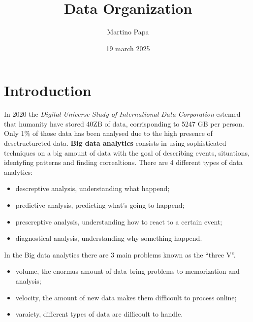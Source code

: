 \documentclass{report}
\title{Data Organization}
\author{Martino Papa}
\date{19 march 2025}
\begin{document}
\maketitle
\tableofcontents

\chapter*{Introduction}
In 2020 the \textit{Digital Universe Study of International Data Corporation} estemed that humanity have stored 40ZB of data, corrisponding to 5247 GB per person. Only 1\% of those data has been analysed due to the high presence of desctructureted data. \textbf{Big data analytics} consists in using sophisticated techniques on a big amount of data with the goal of describing events, situations, identyfing patterns and finding correaltions. There are 4 different types of data analytics:
\begin{itemize}
    \item descreptive analysis, understanding what happend;
    \item predictive analysis, predicting what's going to happend;
    \item prescreptive analysis, understanding how to react to a certain event;
    \item diagnostical analysis, understanding why something happend.
\end{itemize}
In the Big data analytics there are 3 main problems known as the “three V”.
\begin{itemize}
    \item volume, the enormus amount of data bring problems to memorization and analysis;
    \item velocity, the amount of new data makes them difficoult to process online;
    \item varaiety, different types of data are difficoult to handle.
\end{itemize}
\end{document}
